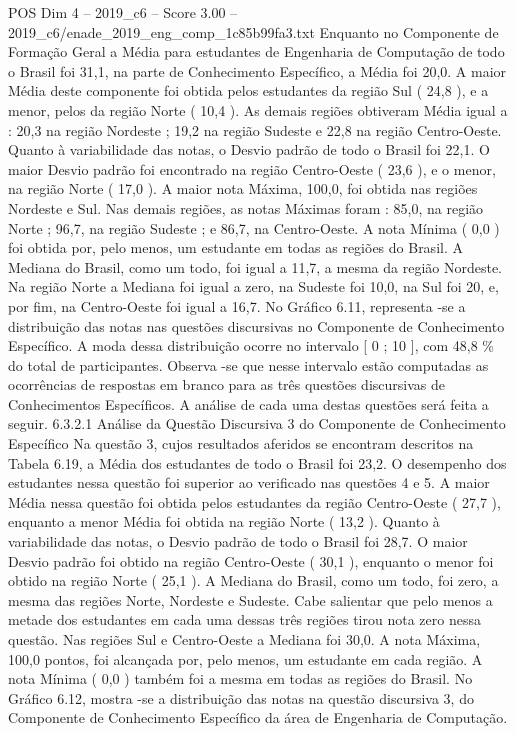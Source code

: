 \begin{textsample}{POS Dim 4 – 2019\_c6 – Score 3.00 – 2019\_c6/enade\_2019\_eng\_comp\_1c85b99fa3.txt}
Enquanto no Componente de Formação Geral a Média para estudantes de Engenharia de Computação de todo o Brasil foi 31,1, na parte de Conhecimento Específico, a Média foi 20,0.
A maior Média deste componente foi obtida pelos estudantes da região Sul ( 24,8 ), e a menor, pelos da região Norte ( 10,4 ).
As demais regiões obtiveram Média igual a : 20,3 na região Nordeste ; 19,2 na região Sudeste e 22,8 na região Centro-Oeste.
Quanto à variabilidade das notas, o Desvio padrão de todo o Brasil foi 22,1.
O maior Desvio padrão foi encontrado na região Centro-Oeste ( 23,6 ), e o menor, na região Norte ( 17,0 ).
A maior nota Máxima, 100,0, foi obtida nas regiões Nordeste e Sul.
Nas demais regiões, as notas Máximas foram : 85,0, na região Norte ; 96,7, na região Sudeste ; e 86,7, na Centro-Oeste.
A nota Mínima ( 0,0 ) foi obtida por, pelo menos, um estudante em todas as regiões do Brasil.
A Mediana do Brasil, como um todo, foi igual a 11,7, a mesma da região Nordeste.
Na região Norte a Mediana foi igual a zero, na Sudeste foi 10,0, na Sul foi 20, e, por fim, na Centro-Oeste foi igual a 16,7.
No Gráfico 6.11, representa -se a distribuição das notas nas questões discursivas no Componente de Conhecimento Específico.
A moda dessa distribuição ocorre no intervalo [ 0 ; 10 ], com 48,8 \% do total de participantes.
Observa -se que nesse intervalo estão computadas as ocorrências de respostas em branco para as três questões discursivas de Conhecimentos Específicos.
A análise de cada uma destas questões será feita a seguir. 6.3.2.1 Análise da Questão Discursiva 3 do Componente de Conhecimento Específico Na questão 3, cujos resultados aferidos se encontram descritos na Tabela 6.19, a Média dos estudantes de todo o Brasil foi 23,2.
O desempenho dos estudantes nessa questão foi superior ao verificado nas questões 4 e 5.
A maior Média nessa questão foi obtida pelos estudantes da região Centro-Oeste ( 27,7 ), enquanto a menor Média foi obtida na região Norte ( 13,2 ).
Quanto à variabilidade das notas, o Desvio padrão de todo o Brasil foi 28,7.
O maior Desvio padrão foi obtido na região Centro-Oeste ( 30,1 ), enquanto o menor foi obtido na região Norte ( 25,1 ).
A Mediana do Brasil, como um todo, foi zero, a mesma das regiões Norte, Nordeste e Sudeste.
Cabe salientar que pelo menos a metade dos estudantes em cada uma dessas três regiões tirou nota zero nessa questão.
Nas regiões Sul e Centro-Oeste a Mediana foi 30,0.
A nota Máxima, 100,0 pontos, foi alcançada por, pelo menos, um estudante em cada região.
A nota Mínima ( 0,0 ) também foi a mesma em todas as regiões do Brasil.
No Gráfico 6.12, mostra -se a distribuição das notas na questão discursiva 3, do Componente de Conhecimento Específico da área de Engenharia de Computação.

\end{textsample}
